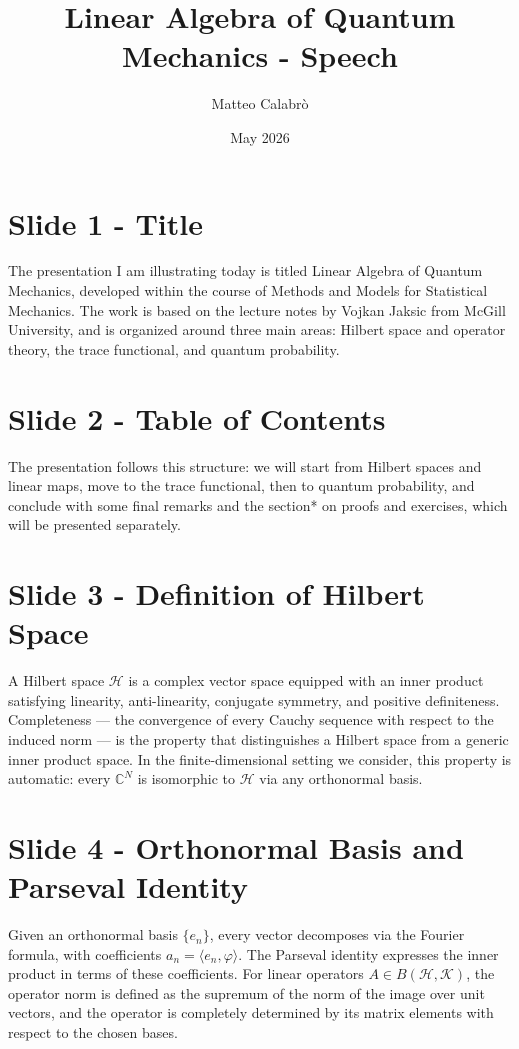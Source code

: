 \documentclass{article}
\title{Linear Algebra of Quantum Mechanics - Speech}
\author{Matteo Calabrò}
\date{May 2026}
\begin{document}
\maketitle

\section*{Slide 1 - Title}
The presentation I am illustrating today is titled Linear Algebra of Quantum Mechanics, developed within the course of Methods and Models for Statistical Mechanics. The work is based on the lecture notes by Vojkan Jaksic from McGill University, and is organized around three main areas: Hilbert space and operator theory, the trace functional, and quantum probability.

\section*{Slide 2 - Table of Contents}
The presentation follows this structure: we will start from Hilbert spaces and linear maps, move to the trace functional, then to quantum probability, and conclude with some final remarks and the section* on proofs and exercises, which will be presented separately.

\section*{Slide 3 - Definition of Hilbert Space}
A Hilbert space $\mathcal{H}$ is a complex vector space equipped with an inner product satisfying linearity, anti-linearity, conjugate symmetry, and positive definiteness. Completeness — the convergence of every Cauchy sequence with respect to the induced norm — is the property that distinguishes a Hilbert space from a generic inner product space. In the finite-dimensional setting we consider, this property is automatic: every $\mathbb{C}^N$ is isomorphic to $\mathcal{H}$ via any orthonormal basis.

\section*{Slide 4 - Orthonormal Basis and Parseval Identity}
Given an orthonormal basis $\{e_n\}$, every vector decomposes via the Fourier formula, with coefficients $a_n = \langle e_n,\varphi \rangle$. The Parseval identity expresses the inner product in terms of these coefficients. For linear operators $A \in B(\mathcal{H},\mathcal{K})$, the operator norm is defined as the supremum of the norm of the image over unit vectors, and the operator is completely determined by its matrix elements with respect to the chosen bases.
\end{document}

